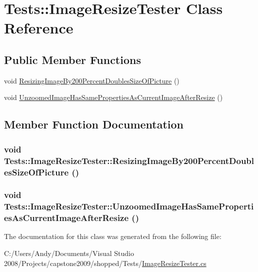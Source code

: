 \hypertarget{class_tests_1_1_image_resize_tester}{
\section{Tests::ImageResizeTester Class Reference}
\label{class_tests_1_1_image_resize_tester}
}
\subsection*{Public Member Functions}
\begin{DoxyCompactItemize}
\item 
void \hyperlink{class_tests_1_1_image_resize_tester_a2ceceeb25362f1535aedc853a08be1d8}{ResizingImageBy200PercentDoublesSizeOfPicture} ()
\item 
void \hyperlink{class_tests_1_1_image_resize_tester_a93619ddc38161c59254054220815b0f7}{UnzoomedImageHasSamePropertiesAsCurrentImageAfterResize} ()
\end{DoxyCompactItemize}


\subsection{Member Function Documentation}
\hypertarget{class_tests_1_1_image_resize_tester_a2ceceeb25362f1535aedc853a08be1d8}{
\subsubsection[{ResizingImageBy200PercentDoublesSizeOfPicture}]{\setlength{\rightskip}{0pt plus 5cm}void Tests::ImageResizeTester::ResizingImageBy200PercentDoublesSizeOfPicture ()}}
\label{class_tests_1_1_image_resize_tester_a2ceceeb25362f1535aedc853a08be1d8}
\hypertarget{class_tests_1_1_image_resize_tester_a93619ddc38161c59254054220815b0f7}{
\subsubsection[{UnzoomedImageHasSamePropertiesAsCurrentImageAfterResize}]{\setlength{\rightskip}{0pt plus 5cm}void Tests::ImageResizeTester::UnzoomedImageHasSamePropertiesAsCurrentImageAfterResize ()}}
\label{class_tests_1_1_image_resize_tester_a93619ddc38161c59254054220815b0f7}


The documentation for this class was generated from the following file:\begin{DoxyCompactItemize}
\item 
C:/Users/Andy/Documents/Visual Studio 2008/Projects/capstone2009/shopped/Tests/\hyperlink{_image_resize_tester_8cs}{ImageResizeTester.cs}\end{DoxyCompactItemize}

